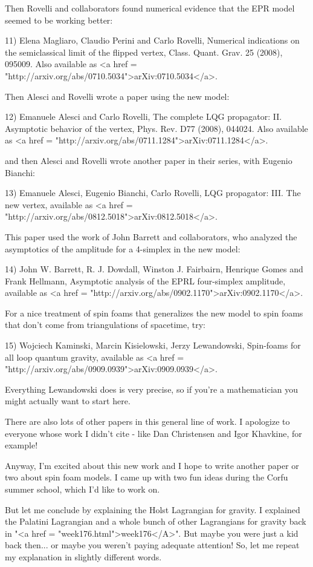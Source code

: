Then Rovelli and collaborators found numerical evidence that the EPR
model seemed to be working better:

11) Elena Magliaro, Claudio Perini and Carlo Rovelli, Numerical
indications on the semiclassical limit of the flipped vertex,
Class. Quant. Grav. 25 (2008), 095009.  Also available as
<a href = "http://arxiv.org/abs/0710.5034">arXiv:0710.5034</a>.

Then Alesci and Rovelli wrote a paper using the new model:

12) Emanuele Alesci and Carlo Rovelli, The complete LQG propagator:
II. Asymptotic behavior of the vertex, Phys. Rev. D77 (2008), 044024.
Also available as <a href = "http://arxiv.org/abs/0711.1284">arXiv:0711.1284</a>.

and then Alesci and Rovelli wrote another paper in their
series, with Eugenio Bianchi:

13) Emanuele Alesci, Eugenio Bianchi, Carlo Rovelli, LQG propagator:
III. The new vertex, available as <a href =
"http://arxiv.org/abs/0812.5018">arXiv:0812.5018</a>.

This paper used the work of John Barrett and collaborators, who
analyzed the asymptotics of the amplitude for a 4-simplex in the new
model:

14) John W. Barrett, R. J. Dowdall, Winston J. Fairbairn, Henrique
Gomes and Frank Hellmann, Asymptotic analysis of the EPRL four-simplex
amplitude, available as <a href = "http://arxiv.org/abs/0902.1170">arXiv:0902.1170</a>.

For a nice treatment of spin foams that generalizes the new model 
to spin foams that don't come from triangulations of spacetime, try:

15) Wojciech Kaminski, Marcin Kisielowski, Jerzy Lewandowski,
Spin-foams for all loop quantum gravity, available as 
<a href = "http://arxiv.org/abs/0909.0939">arXiv:0909.0939</a>.

Everything Lewandowski does is very precise, so if you're a
mathematician you might actually want to start here.
     
There are also lots of other papers in this general line of work.  I
apologize to everyone whose work I didn't cite - like Dan
Christensen and Igor Khavkine, for example!

Anyway, I'm excited about this new work and I hope to write another
paper or two about spin foam models.  I came up with two fun ideas
during the Corfu summer school, which I'd like to work on.

But let me conclude by explaining the Holst Lagrangian for gravity.
I explained the Palatini Lagrangian and a whole bunch of other
Lagrangians for gravity back in "<a href =
"week176.html">week176</A>".  But maybe you were just a kid back
then... or maybe you weren't paying adequate attention!  So, let me
repeat my explanation in slightly different words.

